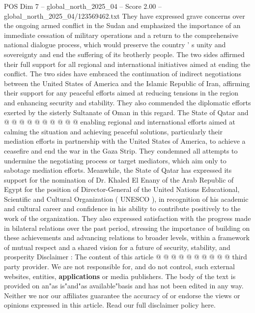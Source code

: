 \begin{textsample}{POS Dim 7 – global\_north\_2025\_04 – Score 2.00 – global\_north\_2025\_04/123569462.txt}
They have expressed grave concerns over the ongoing armed conflict in the Sudan and emphasized the importance of an immediate cessation of military operations and a return to the comprehensive national dialogue process, which would preserve the country ' s unity and sovereignty and end the suffering of its brotherly people.
The two sides affirmed their full support for all regional and international initiatives aimed at ending the conflict.
The two sides have embraced the continuation of indirect negotiations between the United States of America and the Islamic Republic of Iran, affirming their support for any peaceful efforts aimed at reducing tensions in the region and enhancing security and stability.
They also commended the diplomatic efforts exerted by the sisterly Sultanate of Oman in this regard.
The State of Qatar and @ @ @ @ @ @ @ @ @ @ enabling regional and international efforts aimed at calming the situation and achieving peaceful solutions, particularly their mediation efforts in partnership with the United States of America, to achieve a ceasefire and end the war in the Gaza Strip.
They condemned all attempts to undermine the negotiating process or target mediators, which aim only to sabotage mediation efforts.
Meanwhile, the State of Qatar has expressed its support for the nomination of Dr.
Khaled El Enany of the Arab Republic of Egypt for the position of Director-General of the United Nations Educational, Scientific and Cultural Organization ( UNESCO ), in recognition of his academic and cultural career and confidence in his ability to contribute positively to the work of the organization.
They also expressed satisfaction with the progress made in bilateral relations over the past period, stressing the importance of building on these achievements and advancing relations to broader levels, within a framework of mutual respect and a shared vision for a future of security, stability, and prosperity Disclaimer : The content of this article @ @ @ @ @ @ @ @ @ @ third party provider.
We are not responsible for, and do not control, such external websites, entities, \textbf{applications} or media publishers.
The body of the text is provided on an"as is"and"as available"basis and has not been edited in any way.
Neither we nor our affiliates guarantee the accuracy of or endorse the views or opinions expressed in this article.
Read our full disclaimer policy here.

\end{textsample}
